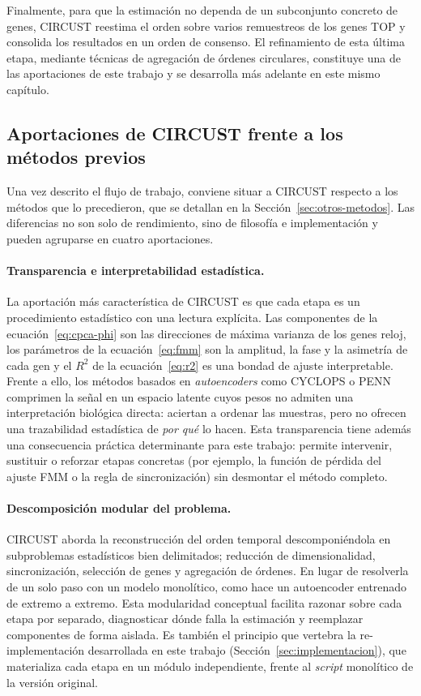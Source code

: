 \documentclass[12pt, a4paper]{report}
\begin{document}
Finalmente, para que la estimación no dependa de un subconjunto concreto de genes, CIRCUST reestima el orden sobre varios remuestreos de los genes TOP y consolida los resultados en un orden de consenso. El refinamiento de esta última etapa, mediante técnicas de agregación de órdenes circulares, constituye una de las aportaciones de este trabajo y se desarrolla más adelante en este mismo capítulo.

\subsection{Aportaciones de CIRCUST frente a los métodos previos}
\label{subsec:aportaciones-circust}

Una vez descrito el flujo de trabajo, conviene situar a CIRCUST respecto a los métodos que lo precedieron, que se detallan en la Sección~\ref{sec:otros-metodos}. Las diferencias no son solo de rendimiento, sino de filosofía e implementación y pueden agruparse en cuatro aportaciones.

\paragraph{Transparencia e interpretabilidad estadística.} La aportación más característica de CIRCUST es que cada etapa es un procedimiento estadístico con una lectura explícita. Las componentes de la ecuación~\eqref{eq:cpca-phi} son las direcciones de máxima varianza de los genes reloj, los parámetros de la ecuación~\eqref{eq:fmm} son la amplitud, la fase y la asimetría de cada gen y el $R^2$ de la ecuación~\eqref{eq:r2} es una bondad de ajuste interpretable. Frente a ello, los métodos basados en \textit{autoencoders} como CYCLOPS o PENN comprimen la señal en un espacio latente cuyos pesos no admiten una interpretación biológica directa: aciertan a ordenar las muestras, pero no ofrecen una trazabilidad estadística de \emph{por qué} lo hacen. Esta transparencia tiene además una consecuencia práctica determinante para este trabajo: permite intervenir, sustituir o reforzar etapas concretas (por ejemplo, la función de pérdida del ajuste FMM o la regla de sincronización) sin desmontar el método completo.

\paragraph{Descomposición modular del problema.} CIRCUST aborda la reconstrucción del orden temporal descomponiéndola en subproblemas estadísticos bien delimitados; reducción de dimensionalidad, sincronización, selección de genes y agregación de órdenes. En lugar de resolverla de un solo paso con un modelo monolítico, como hace un autoencoder entrenado de extremo a extremo. Esta modularidad conceptual facilita razonar sobre cada etapa por separado, diagnosticar dónde falla la estimación y reemplazar componentes de forma aislada. Es también el principio que vertebra la re-implementación desarrollada en este trabajo (Sección~\ref{sec:implementacion}), que materializa cada etapa en un módulo independiente, frente al \textit{script} monolítico de la versión original.
\end{document}

